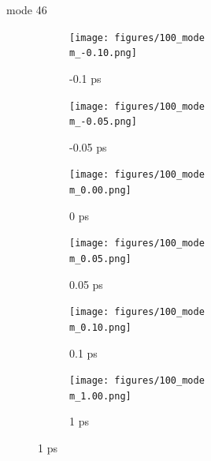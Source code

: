 \documentclass{beamer}
\newcommand\w{0.32}
\begin{document}
\renewcommand\m{46}
\begin{frame}{mode \m}
	\begin{figure}
		\centering
		\begin{subfigure}[b]{\w\textwidth}
			\centering
			\texttt{[image: figures/100\_mode\\m\_-0.10.png]}
			\caption{-0.1 ps}
		\end{subfigure}
		\begin{subfigure}[b]{\w\textwidth}
			\centering
			\texttt{[image: figures/100\_mode\\m\_-0.05.png]}
			\caption{-0.05 ps}
		\end{subfigure}
		\begin{subfigure}[b]{\w\textwidth}
			\centering
			\texttt{[image: figures/100\_mode\\m\_0.00.png]}
			\caption{0 ps}
		\end{subfigure}
		\begin{subfigure}[b]{\w\textwidth}
			\centering
			\texttt{[image: figures/100\_mode\\m\_0.05.png]}
			\caption{0.05 ps}
		\end{subfigure}
		\begin{subfigure}[b]{\w\textwidth}
			\centering
			\texttt{[image: figures/100\_mode\\m\_0.10.png]}
			\caption{0.1 ps}
		\end{subfigure}
		\begin{subfigure}[b]{\w\textwidth}
			\centering
			\texttt{[image: figures/100\_mode\\m\_1.00.png]}
			\caption{1 ps}
		\end{subfigure}
	\end{figure}
\end{frame}
\end{document}
